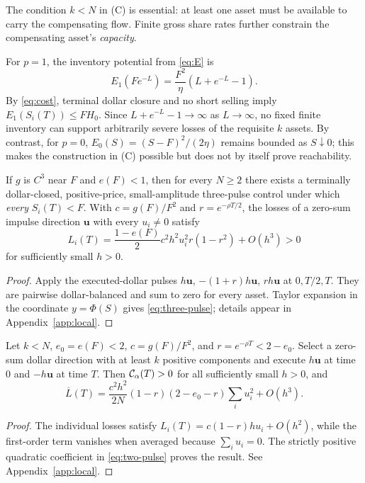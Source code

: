 \documentclass[review,hidelinks,onefignum,onetabnum]{siamonline250211}
\begin{document}
The condition $k<N$ in (C) is essential: at least one asset must be available to carry the compensating flow. Finite gross share rates further constrain the compensating asset's \emph{capacity}.

For $p=1$, the inventory potential from \eqref{eq:E} is
\begin{equation}\label{eq:inventoryb}
E_1(Fe^{-L})=\frac{F^2}{\eta}\left(L+e^{-L}-1\right).
\end{equation}
By \eqref{eq:cost}, terminal dollar closure and no short selling imply $E_1(S_i(T))\le FH_0$. Since $L+e^{-L}-1\to\infty$ as $L\to\infty$, no fixed finite inventory can support arbitrarily severe losses of the requisite $k$ assets. By contrast, for $p=0$, $E_0(S)=(S-F)^2/(2\eta)$ remains bounded as $S\downarrow0$; this makes the construction in (C) possible but does not by itself prove reachability.

\begin{proposition}\label{prop:three-pulse}
If $g$ is $C^3$ near $F$ and $e(F)<1$, then for every $N\ge2$ there exists a terminally dollar-closed, positive-price, small-amplitude three-pulse control under which \emph{every} $S_i(T)<F$. With $c=g(F)/F^2$ and $r=e^{-\rho T/2}$, the losses of a zero-sum impulse direction $\bm u$ with every $u_i\ne0$ satisfy
\begin{equation}\label{eq:three-pulse}
L_i(T)=\frac{1-e(F)}2c^2h^2u_i^2r(1-r^2)+O(h^3)>0
\end{equation}
for sufficiently small $h>0$.
\end{proposition}
\begin{proof}
Apply the executed-dollar pulses $h\bm u$, $-(1+r)h\bm u$, $rh\bm u$ at $0,T/2,T$. They are pairwise dollar-balanced and sum to zero for every asset. Taylor expansion in the coordinate $y=\Phi(S)$ gives \eqref{eq:three-pulse}; details appear in Appendix~\ref{app:local}.
\end{proof}

\begin{proposition}\label{prop:two-pulse}
Let $k<N$, $e_0=e(F)<2$, $c=g(F)/F^2$, and $r=e^{-\rho T}<2-e_0$. Select a zero-sum dollar direction with at least $k$ positive components and execute $h\bm u$ at time $0$ and $-h\bm u$ at time $T$. Then $\mathcal{C}_\alpha(T)>0$ for all sufficiently small $h>0$, and
\begin{equation}\label{eq:two-pulse}
\overline L(T)=\frac{c^2h^2}{2N}(1-r)(2-e_0-r)\sum_iu_i^2+O(h^3).
\end{equation}
\end{proposition}
\begin{proof}
The individual losses satisfy $L_i(T)=c(1-r)hu_i+O(h^2)$, while the first-order term vanishes when averaged because $\sum_i u_i=0$. The strictly positive quadratic coefficient in \eqref{eq:two-pulse} proves the result. See Appendix~\ref{app:local}.
\end{proof}
\end{document}
